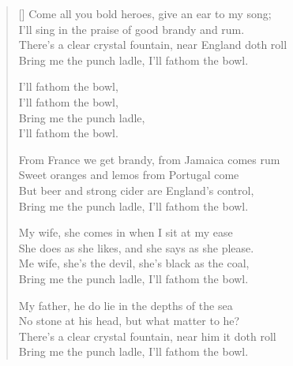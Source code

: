 \pagebreak
\settowidth{\versewidth}{Bring me the punch ladle, I'll fathom the bowl.}
\begin{verse}[\versewidth]
Come all you bold heroes, give an ear to my song;\\
I'll sing in the praise of good brandy and rum.\\
There's a clear crystal fountain, near England doth roll\\
Bring me the punch ladle, I'll fathom the bowl.

\begin{chorus}
I'll fathom the bowl,\\
I'll fathom the bowl,\\
Bring me the punch ladle,\\
I'll fathom the bowl.
\end{chorus}

From France we get brandy, from Jamaica comes rum\\
Sweet oranges and lemos from Portugal come\\
But beer and strong cider are England's control,\\
Bring me the punch ladle, I'll fathom the bowl.

My wife, she comes in when I sit at my ease\\
She does as she likes, and she says as she please.\\
Me wife, she's the devil, she's black as the coal,\\
Bring me the punch ladle, I'll fathom the bowl.

My father, he do lie in the depths of the sea\\
No stone at his head, but what matter to he?\\
There's a clear crystal fountain, near him it doth roll\\
Bring me the punch ladle, I'll fathom the bowl.\\
\end{verse}
